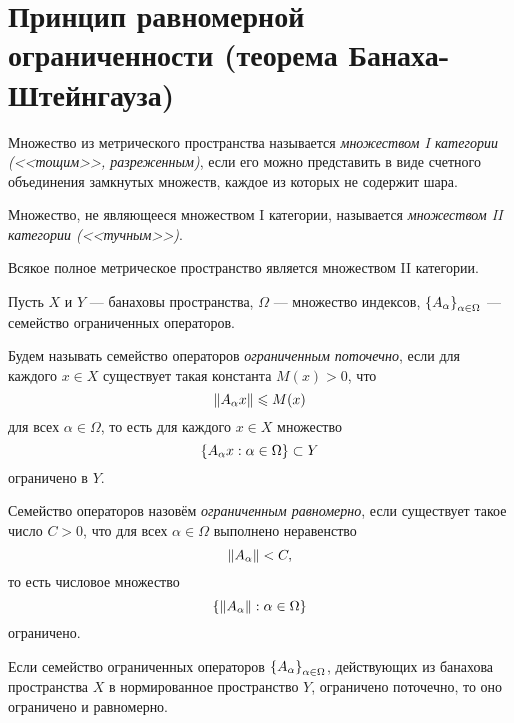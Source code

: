 \section[Принцип равномерной ограниченности]{Принцип равномерной ограниченности
(теорема Банаха-Штейнгауза)}

\begin{definition}
    Множество из метрического пространства называется \emph{множеством I
    категории
    (<<тощим>>, разреженным)}, если его можно представить в виде счетного объединения замкнутых
    множеств, каждое из которых не содержит шара.
\end{definition}

\begin{definition}
    Множество, не являющееся множеством I категории, называется \emph{множеством
    II категории (<<тучным>>)}.
\end{definition}

\begin{theorem}[Бэра]
    Всякое полное метрическое пространство является множеством II категории.
\end{theorem}

Пусть $X$ и $Y$ --- банаховы пространства, $\Omega$ --- множество индексов,
$\left\{A_\alpha\right\}_{\alpha \in \Omega}$ --- семейство ограниченных операторов.

Будем называть семейство операторов \emph{ограниченным поточечно}, если для
каждого $x \in X$ существует такая константа $M(x) > 0$, что
\[ \left\|A_\alpha x\right\| \leqslant M(x) \]
для всех $\alpha \in \Omega$, то есть для каждого $x \in X$ множество
\[ \left\{A_\alpha x : \alpha \in \Omega\right\} \subset Y \]
ограничено в $Y$.

Семейство операторов назовём \emph{ограниченным равномерно}, если существует такое
число $C > 0$, что для всех $\alpha \in \Omega$ выполнено неравенство
\[ \left\|A_\alpha\right\| < C, \]
то есть числовое множество
\[ \left\{\left\|A_\alpha\right\| : \alpha \in \Omega\right\} \]
ограничено.

\begin{theorem}
    Если семейство ограниченных операторов $\left\{A_\alpha\right\}_{\alpha \in \Omega}$,
    действующих из банахова пространства $X$ в нормированное пространство $Y$, 
    ограничено поточечно, то оно ограничено и равномерно. 
\end{theorem}

